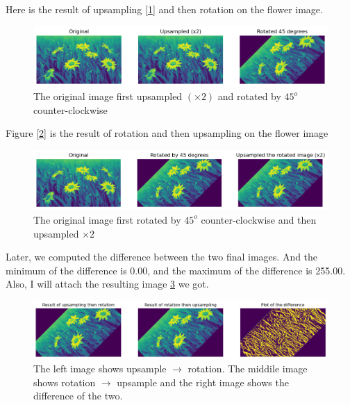 \documentclass[12pt]{article}
\begin{document}
\noindent
Here is the result of upsampling [\ref{fig:upAndRot}] and then rotation on the flower image. 
\begin{figure}[h]
    \centering
    \includegraphics[width=1\linewidth]{upAndRot.png}
    \caption{The original image first upsampled $(\times 2)$ and rotated by $45^o$ counter-clockwise}
    \label{fig:upAndRot}
\end{figure}

Figure [\ref{Figure:rotAndUp}] is the result of rotation  and then upsampling on the flower image
\begin{figure}[h]
    \centering
    \includegraphics[width=1\linewidth]{rotAndUp.png}
    \caption{The original image first rotated by $45^o$ counter-clockwise and then upsampled $\times 2$}
    \label{Figure:rotAndUp}
\end{figure}

Later, we computed the difference between the two final images. And the minimum of the difference is 0.00, and the maximum of the difference is 255.00. Also, I will attach the resulting image \ref{diff} we got.
\begin{figure}[h!]
    \centering
    \includegraphics[width=1\linewidth]{diff.png}
    \caption{The left image shows upsample $\rightarrow$ rotation. The middile image shows rotation $\rightarrow$ upsample and the right image shows the difference of the two.}
    \label{diff}
\end{figure}
\end{document}

